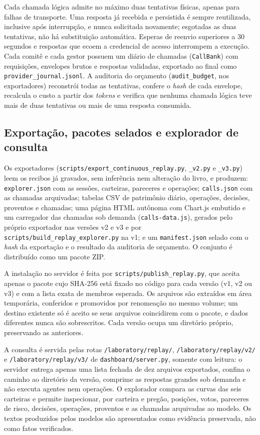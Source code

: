 \documentclass{eic-bcc-tcc}
\begin{document}
Cada chamada lógica admite no máximo duas tentativas físicas, apenas para falhas de transporte. Uma resposta já recebida e persistida é sempre reutilizada, inclusive após interrupção, e nunca solicitada novamente; esgotadas as duas tentativas, não há substituição automática. Esperas de reenvio superiores a 30 segundos e respostas que ecoem a credencial de acesso interrompem a execução. Cada comitê e cada gestor possuem um diário de chamadas (\texttt{CallBank}) com requisições, envelopes brutos e respostas validadas, exportado ao final como \texttt{provider\_journal.jsonl}. A auditoria do orçamento (\texttt{audit\_budget}, nos exportadores) reconstrói todas as tentativas, confere o \textit{hash} de cada envelope, recalcula o custo a partir dos \textit{tokens} e verifica que nenhuma chamada lógica teve mais de duas tentativas ou mais de uma resposta consumida.

\subsection{Exportação, pacotes selados e explorador de consulta}

Os exportadores (\texttt{scripts/export\_continuous\_replay.py}, \texttt{\_v2.py} e \texttt{\_v3.py}) leem os recibos já gravados, sem inferência nem alteração do livro, e produzem: \texttt{explorer.json} com as sessões, carteiras, pareceres e operações; \texttt{calls.json} com as chamadas arquivadas; tabelas CSV de patrimônio diário, operações, decisões, proventos e chamadas; uma página HTML autônoma com Chart.js embutido e um carregador das chamadas sob demanda (\texttt{calls-data.js}), gerados pelo próprio exportador nas versões v2 e v3 e por \texttt{scripts/build\_replay\_explorer.py} na v1; e um \texttt{manifest.json} selado com o \textit{hash} da exportação e o resultado da auditoria de orçamento. O conjunto é distribuído como um pacote ZIP.

A instalação no servidor é feita por \texttt{scripts/publish\_replay.py}, que aceita apenas o pacote cujo SHA-256 está fixado no código para cada versão (v1, v2 ou v3) e com a lista exata de membros esperada. Os arquivos são extraídos em área temporária, conferidos e promovidos por renomeação no mesmo volume; um destino existente só é aceito se seus arquivos coincidirem com o pacote, e dados diferentes nunca são sobrescritos. Cada versão ocupa um diretório próprio, preservando as anteriores.

A consulta é servida pelas rotas \texttt{/laboratory/replay/}, \texttt{/laboratory/replay/v2/} e \texttt{/laboratory/replay/v3/} de \texttt{dashboard/server.py}, somente com leitura: o servidor entrega apenas uma lista fechada de dez arquivos exportados, confina o caminho ao diretório da versão, comprime as respostas grandes sob demanda e não executa agentes nem operações. O explorador compara as curvas das seis carteiras e permite inspecionar, por carteira e pregão, posições, votos, pareceres de risco, decisões, operações, proventos e as chamadas arquivadas ao modelo. Os textos produzidos pelos modelos são apresentados como evidência preservada, não como fatos verificados.
\end{document}
